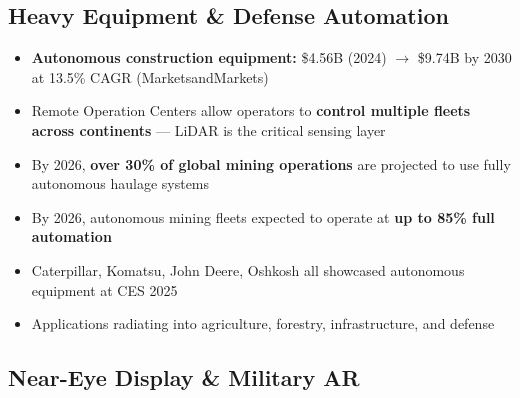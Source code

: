 \documentclass[11pt,letterpaper]{article}
\begin{document}
\subsection{Heavy Equipment \& Defense Automation}

\begin{itemize}
\item \textbf{Autonomous construction equipment:} \$4.56B (2024) $\rightarrow$ \$9.74B by 2030 at 13.5\% CAGR (MarketsandMarkets)
\item Remote Operation Centers allow operators to \textbf{control multiple fleets across continents} --- LiDAR is the critical sensing layer
\item By 2026, \textbf{over 30\% of global mining operations} are projected to use fully autonomous haulage systems
\item By 2026, autonomous mining fleets expected to operate at \textbf{up to 85\% full automation}
\item Caterpillar, Komatsu, John Deere, Oshkosh all showcased autonomous equipment at CES 2025
\item Applications radiating into agriculture, forestry, infrastructure, and defense
\end{itemize}

\subsection{Near-Eye Display \& Military AR}
\end{document}
